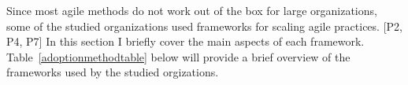 Since most agile methods do not work out of the box for large
organizations, some of the studied organizations used frameworks for
scaling agile practices. [P2, P4, P7] In this section I briefly cover
the main aspects of each framework. Table~\ref{adoptionmethodtable} below will provide a brief overview
of the frameworks used by the studied orgizations.

\bigskip
{
}
\bigskip
